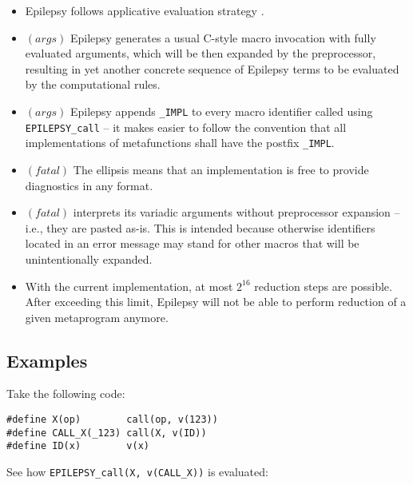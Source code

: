 \documentclass[12pt]{article}
\theoremstyle{break}
\begin{document}
\begin{itemize}
    \item Epilepsy follows applicative evaluation strategy \cite{ApplicativeEvaluationStrategy}.

    \item $(args)$ Epilepsy generates a usual C-style macro invocation with
    fully evaluated arguments, which will be then expanded by the preprocessor, resulting
    in yet another concrete sequence of Epilepsy terms to be evaluated by the computational
    rules.
    \item $(args)$ Epilepsy appends \texttt{\_IMPL} to every macro identifier called using
    \texttt{EPILEPSY\_call} -- it makes easier to follow the convention that all implementations
    of metafunctions shall have the postfix \texttt{\_IMPL}.
    \item $(fatal)$ The ellipsis means that an implementation is free to provide
    diagnostics in any format.
    \item $(fatal)$ interprets its variadic arguments without preprocessor expansion -- i.e.,
    they are pasted as-is. This is intended because otherwise identifiers located in an
    error message may stand for other macros that will be unintentionally expanded.
    \item With the current implementation, at most $2^{16}$ reduction steps are
    possible. After exceeding this limit, Epilepsy will not be able to perform reduction
    of a given metaprogram anymore.
\end{itemize}

\subsection{Examples}

Take the following code:

\begin{verbatim}
#define X(op)        call(op, v(123))
#define CALL_X(_123) call(X, v(ID))
#define ID(x)        v(x)
\end{verbatim}

See how \texttt{EPILEPSY\_call(X, v(CALL\_X))} is evaluated:
\end{document}
